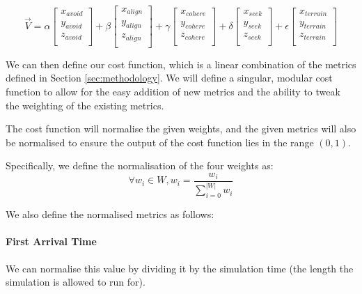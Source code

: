 \documentclass[12pt]{article}
\begin{document}
\begin{equation}
\vec{V} = 
\alpha
\begin{bmatrix}
    x_{avoid} \\
    y_{avoid} \\
    z_{avoid} \\
\end{bmatrix}
+ \beta
\begin{bmatrix}
    x_{align} \\
    y_{align} \\
    z_{align} \\
\end{bmatrix}
+ \gamma
\begin{bmatrix}
    x_{cohere} \\
    y_{cohere} \\
    z_{cohere} \\
\end{bmatrix}
+ \delta
\begin{bmatrix}
    x_{seek} \\
    y_{seek} \\
    z_{seek} \\
\end{bmatrix}
+ \epsilon
\begin{bmatrix}
    x_{terrain} \\
    y_{terrain} \\
    z_{terrain} \\
\end{bmatrix}
\end{equation}

We can then define our cost function, which is a linear combination of the metrics defined in Section \ref{sec:methodology}. We will define a singular, modular cost function to allow for the easy addition of new metrics and the ability to tweak the weighting of the existing metrics. 

The cost function will normalise the given weights, and the given metrics will also be normalised to ensure the output of the cost function lies in the range $(0,1)$.

Specifically, we define the normalisation of the four weights as:
\begin{equation}
    \forall w_i \in W, w_i = \frac{w_i}{\sum_{i=0}^{|W|}{w_i}}
\end{equation}

We also define the normalised metrics as follows:

\paragraph{First Arrival Time}
We can normalise this value by dividing it by the simulation time (the length the simulation is allowed to run for).
\end{document}
